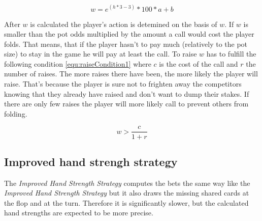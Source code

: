 \begin{equation}
	\label{equ:handStrength1}
	w = e^{(h * 3 - 3)} * 100 * a + b
\end{equation}

After $w$ is calculated the player's action is detemined on the basis of $w$. If $w$ is smaller than the pot odds multiplied by the amount a call would cost the player folds. That means, that if the player hasn't to pay much (relatively to the pot size) to stay in the game he will pay at least the call. To raise $w$ has to fulfill the following condition \ref{equ:raiseCondition1} where $c$ is the cost of the call and $r$ the number of raises. The more raises there have been, the more likely the player will raise. That's because the player is sure not to frighten away the competitors knowing that they already have raised and don't want to dump their stakes. If there are only few raises the player will more likely call to prevent others from folding.

\begin{equation}
	\label{equ:raiseCondition}
	w > \frac{c}{1 + r}
\end{equation}


\subsection{Improved hand strengh strategy}
The \emph{Improved Hand Strength Strategy} computes the bets the same way like the \emph{Improved Hand Strength Strategy} but it also draws the missing shared cards at the flop and at the turn. Therefore it is significantly slower, but the calculated hand strengths are expected to be more precise.

